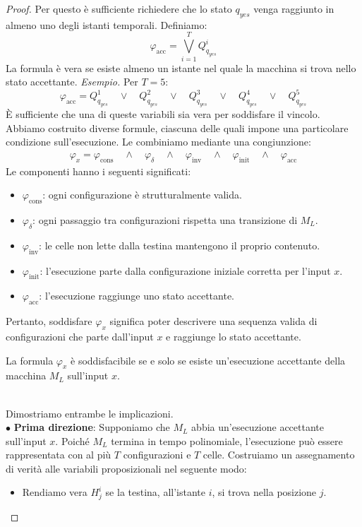 \begin{proof}
Per questo è sufficiente richiedere che
lo stato $q_{yes}$ venga raggiunto
in almeno uno degli istanti temporali.
Definiamo:
\[
\boxed{
\varphi_{\text{acc}}=
\bigvee_{i=1}^{T}Q_{q_{yes}}^i
}
\]
La formula è vera se esiste almeno un
istante nel quale la macchina si trova
nello stato accettante.
\textit{Esempio.}
Per $T=5$:
\[
\varphi_{\text{acc}}=
Q_{q_{yes}}^1\quad\lor\quad Q_{q_{yes}}^2
\quad\lor\quad Q_{q_{yes}}^3\quad\lor\quad Q_{q_{yes}}^4
\quad\lor\quad Q_{q_{yes}}^5
\]
È sufficiente che una di queste variabili
sia vera per soddisfare il vincolo.\smallskip\\
Abbiamo costruito diverse formule,
ciascuna delle quali impone una particolare
condizione sull'esecuzione.
Le combiniamo mediante una congiunzione:
\[
\boxed{
\begin{aligned}
\varphi_x={}
\varphi_{\text{cons}}
\quad\land\quad\varphi_\delta
\quad\land\quad\varphi_{\text{inv}}
\quad\land\quad\varphi_{\text{init}}
\quad\land\quad\varphi_{\text{acc}}
\end{aligned}
}
\]
Le componenti hanno i seguenti significati:
\begin{itemize}
    \item $\varphi_{\text{cons}}$:
    ogni configurazione è strutturalmente valida.

    \item $\varphi_\delta$:
    ogni passaggio tra configurazioni
    rispetta una transizione di $M_L$.

    \item $\varphi_{\text{inv}}$:
    le celle non lette dalla testina
    mantengono il proprio contenuto.

    \item $\varphi_{\text{init}}$:
    l'esecuzione parte dalla configurazione
    iniziale corretta per l'input $x$.

    \item $\varphi_{\text{acc}}$:
    l'esecuzione raggiunge uno stato accettante.
\end{itemize}
Pertanto, soddisfare $\varphi_x$ significa
poter descrivere una sequenza valida
di configurazioni che parte dall'input $x$
e raggiunge lo stato accettante.\smallskip\\
\colorbox{SALZO}{\parbox{\dimexpr\linewidth-2\fboxsep}{
\begin{theorem}
La formula $\varphi_x$ è soddisfacibile
se e solo se esiste un'esecuzione accettante
della macchina $M_L$ sull'input $x$.
\end{theorem}
}}\smallskip\\
Dimostriamo entrambe le implicazioni.\smallskip\\
$\bullet$ \textbf{Prima direzione}:
Supponiamo che $M_L$ abbia un'esecuzione
accettante sull'input $x$.
Poiché $M_L$ termina in tempo polinomiale,
l'esecuzione può essere rappresentata
con al più $T$ configurazioni e $T$ celle.
Costruiamo un assegnamento di verità alle
variabili proposizionali nel seguente modo:
\begin{itemize}[label = --]
    \item Rendiamo vera $H_j^i$ se la testina,
    all'istante $i$, si trova nella posizione $j$.


\end{itemize}
\end{proof}
